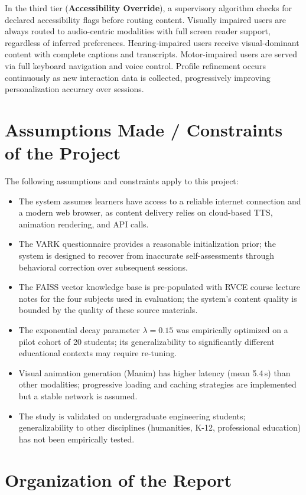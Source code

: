 In the third tier (\textbf{Accessibility Override}), a supervisory algorithm checks for declared accessibility flags before routing content. Visually impaired users are always routed to audio-centric modalities with full screen reader support, regardless of inferred preferences. Hearing-impaired users receive visual-dominant content with complete captions and transcripts. Motor-impaired users are served via full keyboard navigation and voice control. Profile refinement occurs continuously as new interaction data is collected, progressively improving personalization accuracy over sessions.

\section[Assumptions Made / Constraints of the Project]{\textbf{Assumptions Made / Constraints of the Project}}

The following assumptions and constraints apply to this project:
\begin{itemize}
	\item The system assumes learners have access to a reliable internet connection and a modern web browser, as content delivery relies on cloud-based TTS, animation rendering, and API calls.
	\item The VARK questionnaire provides a reasonable initialization prior; the system is designed to recover from inaccurate self-assessments through behavioral correction over subsequent sessions.
	\item The FAISS vector knowledge base is pre-populated with RVCE course lecture notes for the four subjects used in evaluation; the system's content quality is bounded by the quality of these source materials.
	\item The exponential decay parameter $\lambda = 0.15$ was empirically optimized on a pilot cohort of 20 students; its generalizability to significantly different educational contexts may require re-tuning.
	\item Visual animation generation (Manim) has higher latency (mean 5.4\,s) than other modalities; progressive loading and caching strategies are implemented but a stable network is assumed.
	\item The study is validated on undergraduate engineering students; generalizability to other disciplines (humanities, K-12, professional education) has not been empirically tested.
\end{itemize}

\section[Organization of the Report]{\textbf{Organization of the Report}}

